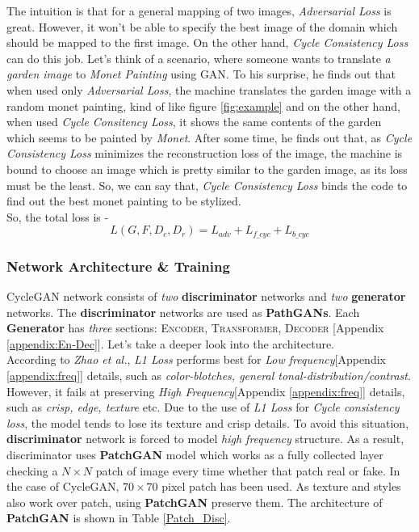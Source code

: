 The intuition is that for a general mapping of two images, \textit{Adversarial Loss} is great. However, it won't be able to specify the best image of the domain which should be mapped to the first image. On the other hand, \textit{Cycle Consistency Loss} can do this job. Let's think of a scenario, where someone wants to translate \textit{a garden image} to \textit{Monet Painting} using GAN. To his surprise, he finds out that when used only \textit{Adversarial Loss}, the machine translates the garden image with a random monet painting, kind of like figure \ref{fig:example} and on the other hand, when used \textit{Cycle Consitency Loss}, it shows the same contents of the garden which seems to be painted by \textit{Monet}. After some time, he finds out that, as \textit{Cycle Consistency Loss} minimizes the reconstruction loss of the image, the machine is bound to choose an image which is pretty similar to the garden image, as its loss must be the least. So, we can say that, \textit{Cycle Consistency Loss} binds the code to find out the best monet painting to be stylized.
\\

So, the total loss is - 
 $$L(G, F, D_c, D_r) = L_{adv} + L_{f\_cyc} + L_{b\_cyc}$$
 
\subsubsection{Network Architecture \& Training}
CycleGAN\cite{cyclegan} network consists of \textit{two}\textbf{ discriminator} networks and \textit{two} \textbf{generator} networks. The \textbf{discriminator} networks are used as \textbf{PathGANs}. Each \textbf{Generator} has \textit{three} sections: \textsc{Encoder, Transformer, Decoder} [Appendix \ref{appendix:En-Dec}]. Let's take a deeper look into the architecture.
\\
According to \textit{Zhao et al.}\cite{DBLP:journals/tci/ZhaoGFK17}, \textit{L1 Loss} performs best for \textit{Low frequency}[Appendix \ref{appendix:freq}] details, such as \textit{color-blotches, general tonal-distribution/contrast}. However, it fails at preserving \textit{High Frequency}[Appendix \ref{appendix:freq}] details, such as \textit{crisp, edge, texture} etc. Due to the use of \textit{L1 Loss} for \textit{Cycle consistency loss}, the model tends to lose its texture and crisp details. To avoid this situation, \textbf{discriminator} network is forced to model \textit{high frequency} structure. As a result, discriminator uses \textbf{PatchGAN} model which works as a fully collected layer checking a $N \times N$ patch of image every time whether that patch real or fake. In the case of CycleGAN, $70 \times 70$ pixel patch has been used. As texture and styles also work over patch, using \textbf{PatchGAN} preserve them. The architecture of \textbf{PatchGAN} is shown in Table \ref{Patch_Disc}.

